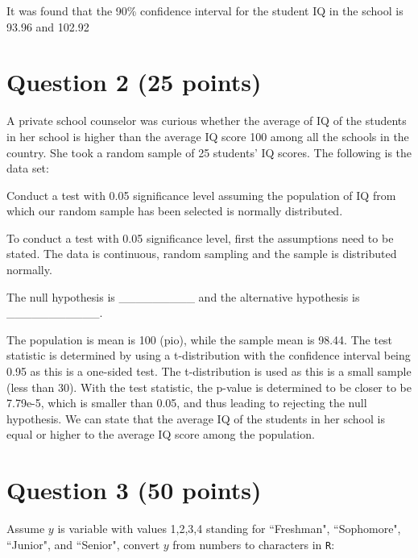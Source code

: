 \documentclass[12pt,letterpaper]{article}
\begin{document}
It was found that the 90\% confidence interval for the student IQ in the school is 93.96 and 102.92

\vspace{1cm}
\section*{Question 2 (25 points)}
A private school counselor was curious  whether  the average of IQ of the students in her school is higher than the average IQ score 100 among all the schools in the country. She took a random sample of 25 students' IQ scores. The following is the data set:
\vspace{.5cm}
  
\vspace{.5cm}

\noindent Conduct a test with 0.05 significance level assuming the population of IQ from which our random sample has been selected is normally distributed. 
 
 
 
To conduct a test with 0.05 significance level, first the assumptions need to be stated. 
The data is continuous, random sampling and the sample is distributed normally. 

The null hypothesis is _________ and the alternative hypothesis is ___________. 

The population is mean is 100 (pio), while the sample mean is 98.44. 
The test statistic is determined by using a t-distribution with the confidence interval being 0.95 as this is a one-sided test. The t-distribution is used as this is a small sample (less than 30). With the test statistic, the p-value is determined to be closer to be 7.79e-5, which is smaller than 0.05, and thus leading to rejecting the null hypothesis. 
We can state that the average IQ of the students in her school is equal or higher to the average IQ score among the population. 

 
\vspace{1cm}
	\section*{Question 3 (50 points)}
Assume $y$ is variable with values 1,2,3,4 standing for ``Freshman", ``Sophomore", ``Junior", and ``Senior", convert $y$ from numbers to characters in \texttt{R}:
\vspace{.5cm}
  
\vspace{.5cm}
\end{document}
